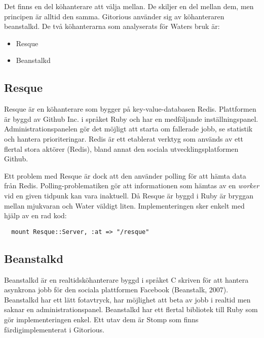 Det finns en del köhanterare att välja mellan. De skiljer en del mellan dem, men principen är alltid den samma. Gitorious använder sig  av köhanteraren beanstalkd.
De två köhanterarna som analyserats för Waters bruk är:

\begin{itemize}
  \item Resque
  \item Beanstalkd
\end{itemize}

\subsection{Resque}

Resque är en köhanterare som bygger på key-value-databasen Redis. Plattformen
är byggd av Github Inc. i språket Ruby och har en medföljande
inställningspanel. Administrationspanelen gör det möjligt att starta om
fallerade jobb, se statistik och hantera prioriteringar. Redis är ett etablerat
verktyg som används av ett flertal stora aktörer (Redis), bland annat den sociala utvecklingsplatformen Github.

Ett problem med Resque är dock att den använder polling för att hämta data från
Redis. Polling-problematiken gör att informationen som hämtas av en \emph{worker} vid
en given tidpunk kan vara inaktuell. Då Resque är byggd i Ruby är bryggan
mellan mjukvaran och Water väldigt liten. Implementeringen sker enkelt med
hjälp av en rad kod:

\begin{verbatim}
  mount Resque::Server, :at => "/resque"
\end{verbatim}

\subsection{Beanstalkd}
Beanstalkd är en realtidsköhanterare byggd i språket C skriven för att hantera asynkrona jobb för den sociala plattformen Facebook (Beanstalk, 2007). Beanstalkd har ett lätt fotavtryck, har möjlighet att beta av jobb i realtid men saknar en administrationspanel.
Beanstalkd har ett flertal bibliotek till Ruby som gör implementeringen enkel. Ett utav dem är Stomp som finns färdigimplementerat i Gitorious.
